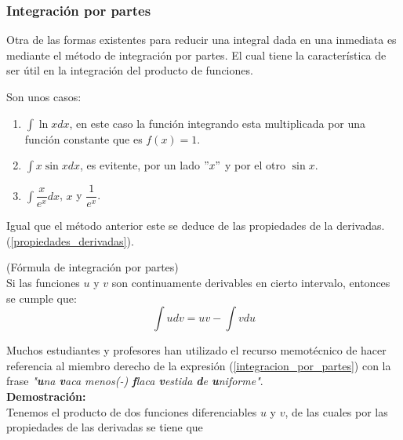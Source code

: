 \documentclass[10pt,twoside]{SelfArx} %
\begin{document}
 
 
 
 
 
 
 
 
 
 
 \subsubsection{Integración por partes}
 Otra de las formas existentes para reducir una integral dada en una inmediata es mediante el método de integración por partes. El cual tiene la característica de ser útil en la integración del producto de funciones.
 \begin{ejemplo}
 	Son unos casos:
 	\begin{enumerate}
 		\item $ \displaystyle\int\ln xdx $, en este caso la función integrando esta multiplicada por una función constante que es $ f(x)=1 $.
 		\item $ \displaystyle\int x\sin xdx $, es evitente, por un lado $ "x" $ y por el otro $ \sin x $.
 		\item $ \displaystyle\int \dfrac{x}{e^{x}}dx $, $ x $ y $ \dfrac{1}{e^{x}} $.
 	\end{enumerate}
  \end{ejemplo}
  Igual que el método anterior  este se deduce de las propiedades de la derivadas.(\ref{propiedades_derivadas}).
  \begin{teorema}
  	(Fórmula de integración por partes)\\
  	Si las funciones $ u $ y $ v $ son continuamente derivables en cierto intervalo, entonces se cumple que:
  	\begin{equation}
  	\int udv=uv-\int vdu\label{integracion_por_partes}
  	\end{equation}
  \end{teorema}
 Muchos estudiantes y profesores han utilizado el recurso memotécnico de hacer referencia al miembro derecho de la expresión (\ref{integracion_por_partes}) con la frase \textsl{"\textbf{u}na \textbf{v}aca menos(-) \textbf{f}laca \textbf{v}estida \textbf{d}e \textbf{u}niforme"}.\\
 \textbf{Demostración:}\\
 Tenemos el producto de dos funciones diferenciables $ u $ y $ v $, de las cuales por las propiedades de las derivadas se tiene que
\end{document}
